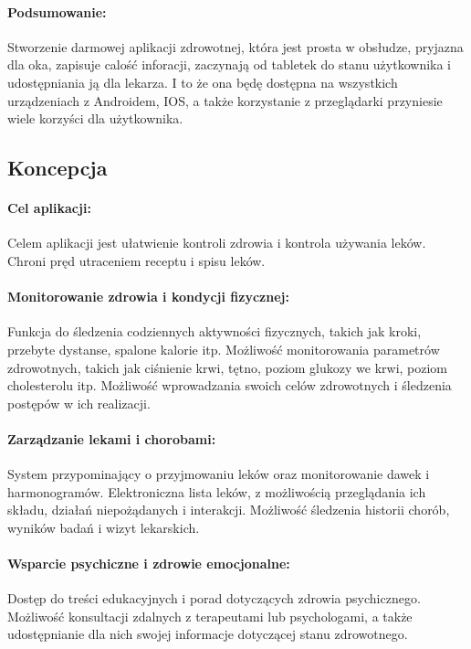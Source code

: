 \paragraph{Podsumowanie:} Stworzenie darmowej aplikacji zdrowotnej, która jest prosta w obsłudze, pryjazna dla oka, zapisuje calość inforacji, zaczynają od tabletek do stanu użytkownika i udostępniania ją dla lekarza. I to że ona będę dostępna na wszystkich urządzeniach z Androidem, IOS, a także korzystanie z przeglądarki przyniesie wiele korzyści dla użytkownika.

\begin{center}
  \subsection{Koncepcja}
\end{center}

\paragraph{Cel aplikacji:} Celem aplikacji jest ułatwienie kontroli zdrowia i kontrola używania leków. Chroni pręd utraceniem receptu i spisu leków.

\paragraph{Monitorowanie zdrowia i kondycji fizycznej:} Funkcja do śledzenia codziennych aktywności fizycznych, takich jak kroki, przebyte dystanse, spalone kalorie itp.  Możliwość monitorowania parametrów zdrowotnych, takich jak ciśnienie krwi, tętno, poziom glukozy we krwi, poziom cholesterolu itp.  Możliwość wprowadzania swoich celów zdrowotnych i śledzenia postępów w ich realizacji.

\paragraph{Zarządzanie lekami i chorobami:} System przypominający o przyjmowaniu leków oraz monitorowanie dawek i harmonogramów. Elektroniczna lista leków, z możliwością przeglądania ich składu, działań niepożądanych i interakcji.  Możliwość śledzenia historii chorób, wyników badań i wizyt lekarskich.

\paragraph{Wsparcie psychiczne i zdrowie emocjonalne:} Dostęp do treści edukacyjnych i porad dotyczących zdrowia psychicznego. Możliwość konsultacji zdalnych z terapeutami lub psychologami, a także udostępnianie dla nich swojej informacje dotyczącej stanu zdrowotnego. 


